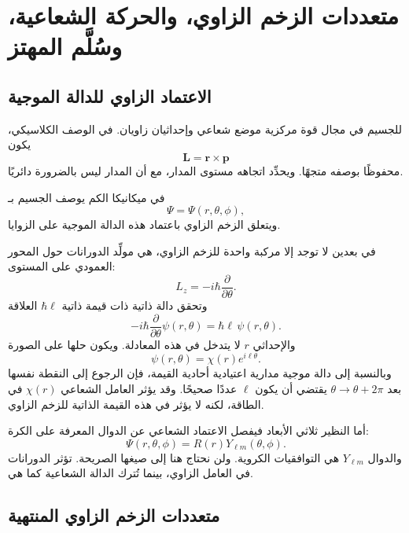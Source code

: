 \chapter{متعددات الزخم الزاوي، والحركة الشعاعية، وسُلَّم المهتز}

\section{الاعتماد الزاوي للدالة الموجية}

للجسيم في مجال قوة مركزية موضع شعاعي وإحداثيان زاويان. في الوصف الكلاسيكي، يكون \begin{equation}
\mathbf L=\mathbf r\times\mathbf p
\end{equation} محفوظًا بوصفه متجهًا. ويحدِّد اتجاهه مستوى المدار، مع أن المدار ليس بالضرورة دائريًا.

في ميكانيكا الكم يوصف الجسيم بـ \begin{equation}
\Psi=\Psi(r,\theta,\phi),
\end{equation} ويتعلق الزخم الزاوي باعتماد هذه الدالة الموجية على الزوايا.

في بعدين لا توجد إلا مركبة واحدة للزخم الزاوي، هي مولِّد الدورانات حول المحور العمودي على المستوى: \begin{equation}
L_z=-i\hbar\frac{\partial}{\partial\theta}.
\end{equation} وتحقق دالة ذاتية ذات قيمة ذاتية \(\hbar\ell\) العلاقة \begin{equation}
-i\hbar\frac{\partial}{\partial\theta}\psi(r,\theta)
=\hbar\ell\,\psi(r,\theta).
\end{equation} والإحداثي \(r\) لا يتدخل في هذه المعادلة. ويكون حلها على الصورة \begin{equation}
\psi(r,\theta)=\chi(r)e^{i\ell\theta}.
\end{equation} وبالنسبة إلى دالة موجية مدارية اعتيادية أحادية القيمة، فإن الرجوع إلى النقطة نفسها بعد \(\theta\to\theta+2\pi\) يقتضي أن يكون \(\ell\) عددًا صحيحًا. وقد يؤثر العامل الشعاعي \(\chi(r)\) في الطاقة، لكنه لا يؤثر في هذه القيمة الذاتية للزخم الزاوي.

أما النظير ثلاثي الأبعاد فيفصل الاعتماد الشعاعي عن الدوال المعرفة على الكرة: \begin{equation}
\Psi(r,\theta,\phi)=R(r)Y_{\ell m}(\theta,\phi).
\end{equation} والدوال \(Y_{\ell m}\) هي التوافقيات الكروية. ولن نحتاج هنا إلى صيغها الصريحة. تؤثر الدورانات في العامل الزاوي، بينما تُترك الدالة الشعاعية كما هي.

\section{متعددات الزخم الزاوي المنتهية}

